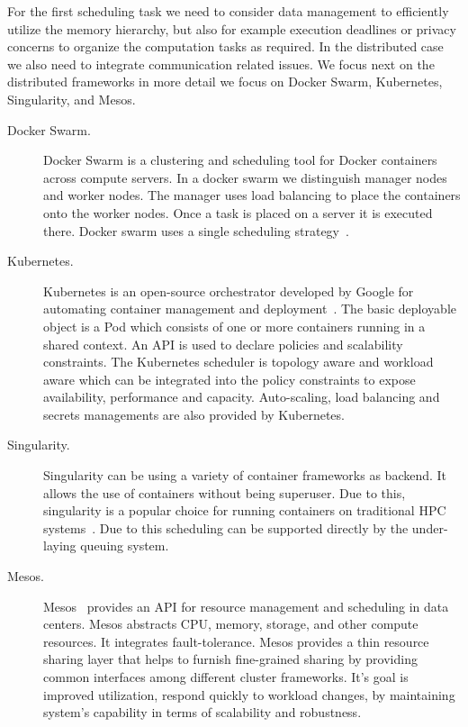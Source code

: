 \documentclass[final,5p,times,twocolumn]{elsarticle}
\begin{document}
For the first scheduling task we need to consider data management to
efficiently utilize the memory hierarchy, but also for example
execution deadlines or privacy concerns to organize the computation
tasks as required. In the distributed case we also need to integrate
communication related issues. We focus next on the distributed
frameworks in more detail we focus on Docker Swarm, Kubernetes,
Singularity, and Mesos.

\begin{description}


\item[Docker Swarm.] Docker Swarm is a clustering and scheduling
tool for Docker containers~\cite{Dockerswarmengine2018} across compute
servers. In a docker swarm we distinguish manager nodes and worker
nodes. The manager uses load balancing to place the containers onto
the worker nodes. Once a task is placed on a server it is executed
there.  Docker swarm uses a single scheduling
strategy~\cite{Dockerswarm2018}.



\item[Kubernetes.] Kubernetes is an open-source orchestrator
developed by Google for automating container management and
deployment~\cite{Kubernates2018}. The basic deployable object is a
Pod which consists of one or more containers running in a shared
context. An API is used to declare policies and scalability
constraints. The Kubernetes scheduler is topology aware and workload
aware which can be integrated into the policy constraints to
expose availability, performance and capacity. Auto-scaling, load
balancing and secrets managements are also provided by Kubernetes.

\item[Singularity.] Singularity can be using a variety of
container frameworks as backend. It allows the use of containers
without being superuser. Due to this, singularity is a popular choice
for running containers on traditional HPC
systems~\cite{www-singularity}. Due to this scheduling can be
supported directly by the under-laying queuing system.


\item[Mesos.] Mesos~\cite{hindman2011mesos,Mesos2018} provides an
API for resource management and scheduling in data centers. Mesos
abstracts CPU, memory, storage, and other compute resources. It
integrates fault-tolerance. Mesos provides a thin resource sharing
layer that helps to furnish fine-grained sharing by providing common
interfaces among different cluster frameworks. It's goal is improved
utilization, respond quickly to workload changes, by maintaining
system's capability in terms of scalability and robustness.



\end{description}
\end{document}
